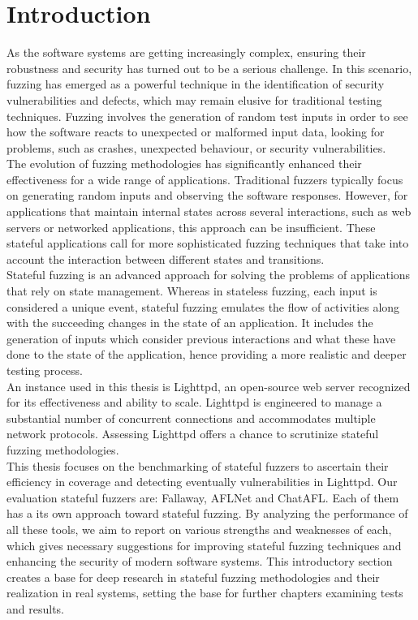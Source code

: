\chapter{Introduction}

As the software systems are getting increasingly complex, ensuring their robustness and security has turned out to be a serious challenge. In this scenario, fuzzing has emerged as a powerful technique in the identification of security vulnerabilities and defects, which may remain elusive for traditional testing techniques. Fuzzing involves the generation of random test inputs in order to see how the software reacts to unexpected or malformed input data, looking for problems, such as crashes, unexpected behaviour, or security vulnerabilities.
\\The evolution of fuzzing methodologies has significantly enhanced their effectiveness for a wide range of applications. Traditional fuzzers typically focus on generating random inputs and observing the software responses. However, for applications that maintain internal states across several interactions, such as web servers or networked applications, this approach can be insufficient. These stateful applications call for more sophisticated fuzzing techniques that take into account the interaction between different states and transitions.
\\Stateful fuzzing is an advanced approach for solving the problems of applications that rely on state management. Whereas in stateless fuzzing, each input is considered a unique event, stateful fuzzing emulates the flow of activities along with the succeeding changes in the state of an application. It includes the generation of inputs which consider previous interactions and what these have done to the state of the application, hence providing a more realistic and deeper testing process.
\\An instance used in this thesis is Lighttpd, an open-source web server recognized for its effectiveness and ability to scale. Lighttpd is engineered to manage a substantial number of concurrent connections and accommodates multiple network protocols. Assessing Lighttpd offers a chance to scrutinize stateful fuzzing methodologies.
\\This thesis focuses on the benchmarking of stateful fuzzers to ascertain their efficiency in coverage and detecting eventually vulnerabilities in Lighttpd. Our evaluation stateful fuzzers are: Fallaway, AFLNet and ChatAFL. Each of them has a its own approach toward stateful fuzzing.
By analyzing the performance of all these tools, we aim to report on various strengths and weaknesses of each, which gives necessary suggestions for improving stateful fuzzing techniques and enhancing the security of modern software systems. This introductory section creates a base for deep research in stateful fuzzing methodologies and their realization in real systems, setting the base for further chapters examining tests and results.